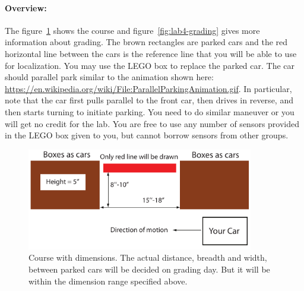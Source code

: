 \documentclass[11pt]{article}
\def\bluehref#1#2{\href{#1}{\color{blue} #2}}
\begin{document}
\paragraph{Overview:}
The figure~\ref{fig:lab4-course} shows the course and figure~\ref{fig:lab4-grading} gives more information about grading. The brown rectangles are parked cars and the red horizontal line between the cars is the reference line that you will be able to use for localization. You may use the LEGO box to replace the parked car. The car should parallel park similar to the animation shown here: \\ \bluehref{https://en.wikipedia.org/wiki/File:ParallelParkingAnimation.gif}{https://en.wikipedia.org/wiki/File:ParallelParkingAnimation.gif}. In particular, note that the car first pulls parallel to the front car, then drives in reverse, and then starts turning to initiate parking. You need to do similar maneuver or you will get no credit for the lab.%
You are free to use any number of sensors provided in the LEGO box given to you, but cannot borrow sensors from other groups. 
 
 \begin{figure}[t]
\begin{center}
 \includegraphics[angle=0, height=1.75in]{figures/lab4_parallel_park2.pdf}
\end{center}
 \caption{Course with dimensions. The actual distance, breadth and width, between parked cars will be decided on grading day. But it will be within the dimension range specified above.}
   \label{fig:lab4-course}
\end{figure}
\end{document}
